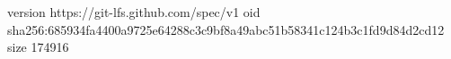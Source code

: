 version https://git-lfs.github.com/spec/v1
oid sha256:685934fa4400a9725e64288c3c9bf8a49abc51b58341c124b3c1fd9d84d2cd12
size 174916
